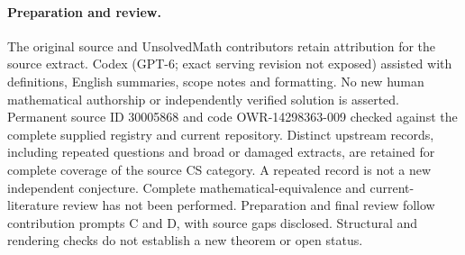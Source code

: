 \documentclass[11pt]{article}
\begin{document}
\paragraph{Preparation and review.}
The original source and UnsolvedMath contributors retain attribution for the source extract. Codex (GPT-6; exact serving revision not exposed) assisted with definitions, English summaries, scope notes and formatting. No new human mathematical authorship or independently verified solution is asserted. Permanent source ID 30005868 and code OWR-14298363-009 checked against the complete supplied registry and current repository. Distinct upstream records, including repeated questions and broad or damaged extracts, are retained for complete coverage of the source CS category. A repeated record is not a new independent conjecture. Complete mathematical-equivalence and current-literature review has not been performed. Preparation and final review follow contribution prompts C and D, with source gaps disclosed. Structural and rendering checks do not establish a new theorem or open status.
\label{end:30005868}
\end{document}

